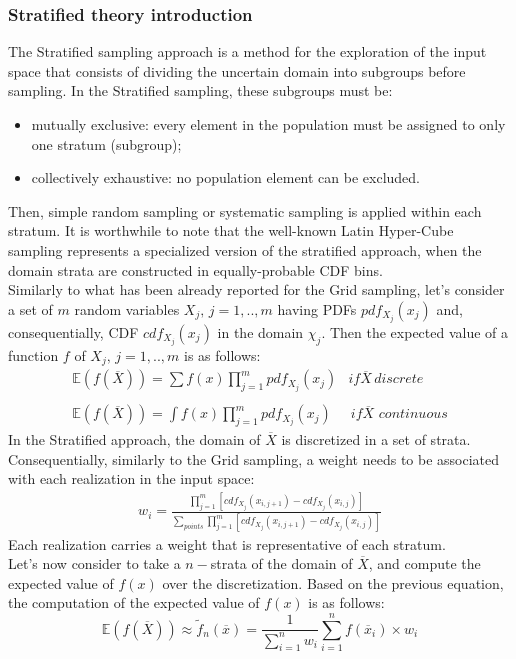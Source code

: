 \subsubsection{Stratified theory introduction}
\label{subsub:Stratifiedtheory}
The Stratified sampling approach is a method for the exploration of the input space that consists of dividing the uncertain domain into subgroups before sampling. In the Stratified sampling, these subgroups must be:
\begin{itemize}
  \item mutually exclusive: every element in the population must be assigned to only one stratum (subgroup);
  \item collectively exhaustive: no population element can be excluded.
\end{itemize}
Then, simple random sampling or systematic sampling is applied within each stratum. It is worthwhile to note that the well-known Latin Hyper-Cube sampling represents a specialized version of the stratified approach, when the domain strata are constructed in equally-probable CDF bins.
\\Similarly to what has been already reported for the Grid sampling, let's consider a set of  $m$ random variables $X_{j}, \, j=1,..,m$ having PDFs $pdf_{X_{j}}(x_{j})$ and, consequentially, CDF $cdf_{X_{j}}(x_{j})$ in the domain $\chi_{j}$. Then the expected value of a function $f$ of $X_{j}, \, j=1,..,m$ is as follows:
\begin{equation}
\begin{matrix}
\mathbb{E}(f(\overline{X})) =\sum f(x)   \prod_{j=1}^{m} pdf_{X_{j}}(x_{j}) & if \overline{X} \, discrete \\ 
\\ 
\mathbb{E}(f(\overline{X})) =\int f(x)\prod_{j=1}^{m} pdf_{X_{j}}(x_{j}) & \, if \overline{X} \, \, continuous
\end{matrix}
\end{equation}
In the Stratified approach, the domain of $\overline{X}$ is discretized in a set of strata. Consequentially, similarly to the Grid sampling, a weight needs to be associated with each realization in the input space:
\begin{equation}
\begin{matrix}
  w_{i}= \frac{\prod_{j=1}^{m} \left [  cdf_{X_{j}}(x_{i,j+1}) - cdf_{X_{j}}(x_{i,j}) \right ]}{\sum_{points}\prod_{j=1}^{m} \left [  cdf_{X_{j}}(x_{i,j+1}) - cdf_{X_{j}}(x_{i,j}) \right ]}
\end{matrix}  
\end{equation}
Each realization carries a weight that is representative of each stratum.
\\Let's now consider 
to take a $n-$strata of the domain of  $\overline{X}$, and compute the expected value of $f(x)$ over the discretization. Based on the previous equation, the computation of the expected value of $f(x)$ is as follows:
\begin{equation}
 \mathbb{E}(f(\overline{X})) \approx   \widetilde{f}_{n}(\overline{x}) = \frac{1}{\sum_{i=1}^{n}w_{i}} \sum_{i=1}^{n} f(\overline{x}_{i}) \times w_{i}
\end{equation}
